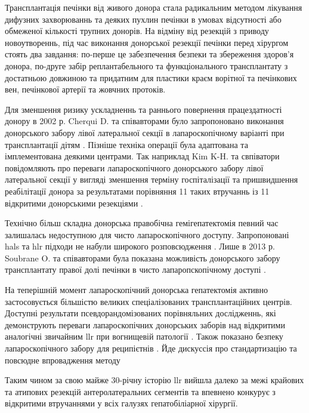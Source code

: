 \begin{refsection}
Трансплантація печінки від живого донора стала радикальним методом лікування дифузних захворюваннь та деяких пухлин печінки в умовах відсутності або обмеженої кількості трупних донорів. На відміну від резекцій з приводу новоутвореннь, під час виконання донорської резекції печінки перед хірургом стоять два завдання: по-перше це забезпечення безпеки та збереження здоров'я донора, по-друге забір реплантабельного та функціонального трансплантату з достатньою довжиною та придатним для пластики краєм ворітної та печінкових вен, печінкової артерії та жовчних протоків. 

Для зменшення ризику ускладненнь та раннього повернення працездатності донору в 2002 р. Cherqui D. та співавторами було запропоновано виконання донорського забору лівої латеральної секції в лапароскопічному варіанті при трансплантації дітям \cite{Cherqui2002a}. Пізніше техніка операції була адаптована та імплементована деякими центрами. Так наприклад Kim K-H. та свпіватори повідомляють про переваги лапароскопічного донорського забору лівої латеральної секції у вигляді зменшення терміну госпіталізації та пришвидшення реабілітації донора за результатами порівняння 11 таких втручаннь із 11 відкритими донорськими резекціями \cite{Kim2011}. 

Технічно більш складна донорська правобічна гемігепатектомія певний час залишалась недоступною для чисто лапароскопічного доступу. Запропоновані \acrshort{hals} та \acrshort{hlr} підходи не набули широкого розповсюдження \cite{Koffron2006, Thenappan2011, Lin2013}. Лише в 2013 р. Soubrane O. та співавторами була показана можливість донорського забору трансплантату правої долі печінки в чисто лапаропскопічному доступі \cite{Soubrane2013}. 

На теперішній момент лапароскопічний донорська гепатектомія активно застосовується більшістю великих спеціалізованих трансплантаційних центрів. Доступні результати псевдорандомізованих порівняльних дослідженнь, які демонструють переваги лапароскопічних донорських заборів над відкритими  аналогічні звичайним \acrshort{llr} при вогнищевій патології \cite{Broering2018, Park2019a}. Також показано безпеку лапароскопічного забору для реципієтнів \cite{Kwon2018a}. Йде дискуссія про стандартизацію та повсюдне впровадження методу \cite{Au2018, Samstein2018}


Таким чином за свою майже 30-річну історію \acrshort{llr} вийшла далеко за межі крайових та атипових резекцій антеролатеральних сегментів та впевнено конкурує з відкритими втручаннями у всіх галузях гепатобіліарної хірургії. 


\end{refsection}
